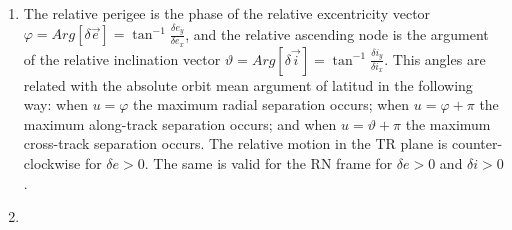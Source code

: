\documentclass[a4paper]{article}
\begin{document}
\begin{enumerate}[label=\emph{\alph*)}]
  \item %
    The relative perigee is the phase of the relative excentricity vector $\varphi = Arg[\delta \vec{e}] = \tan^{-1}{\frac{\delta e_y}{\delta e_x}}$, and the relative ascending node is the argument of the relative inclination vector $\vartheta = Arg[\delta \vec{i}]= \tan^{-1}{\frac{\delta i_y}{\delta i_x}}$. This angles are related with the absolute orbit mean argument of latitud in the following way: when $u = \varphi$ the maximum radial separation occurs; when $u = \varphi+\pi$ the maximum along-track separation occurs; and when $u = \vartheta+\pi$ the maximum cross-track separation occurs. The relative motion in the TR plane is counter-clockwise for $\delta e > 0 $. The same is valid for the RN frame for $\delta e > 0$ and $\delta i > 0$.

  \item %


\end{enumerate}
\end{document}
